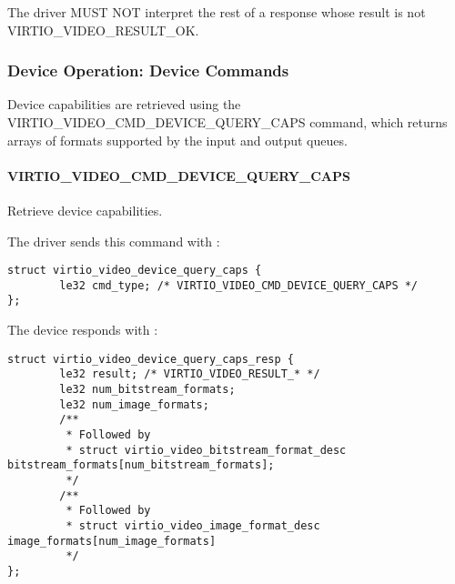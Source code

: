
The driver MUST NOT interpret the rest of a response whose result is not
VIRTIO\_VIDEO\_RESULT\_OK.

\subsubsection{Device Operation: Device Commands}\label{sec:Device Types / Video Device / Device Operation / Device Operation: Device Commands}

Device capabilities are retrieved using the
VIRTIO\_VIDEO\_CMD\_DEVICE\_QUERY\_CAPS command, which returns arrays of
formats supported by the input and output queues.

\paragraph{VIRTIO_VIDEO_CMD_DEVICE_QUERY_CAPS}\label{sec:Device Types / Video Device / Device Operation / Device Operation: Device Commands / VIRTIO_VIDEO_CMD_DEVICE_QUERY_CAPS}

Retrieve device capabilities.

The driver sends this command with
:

\begin{lstlisting}
struct virtio_video_device_query_caps {
        le32 cmd_type; /* VIRTIO_VIDEO_CMD_DEVICE_QUERY_CAPS */
};
\end{lstlisting}

The device responds with
:

\begin{lstlisting}
struct virtio_video_device_query_caps_resp {
        le32 result; /* VIRTIO_VIDEO_RESULT_* */
        le32 num_bitstream_formats;
        le32 num_image_formats;
        /**
         * Followed by
         * struct virtio_video_bitstream_format_desc bitstream_formats[num_bitstream_formats];
         */
        /**
         * Followed by
         * struct virtio_video_image_format_desc image_formats[num_image_formats]
         */
};
\end{lstlisting}


